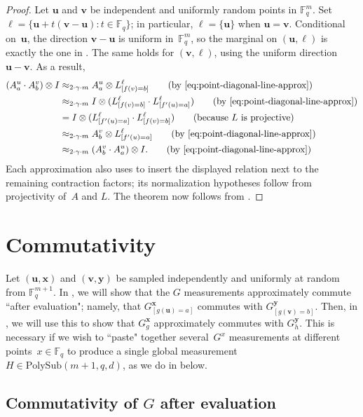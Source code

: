\documentclass[11pt]{article}
\theoremstyle{definition}
\newcommand{\F}{\mathbb F}
\newcommand{\bell}{\boldsymbol{\ell}}
\newcommand{\bu}{\boldsymbol{u}}
\newcommand{\bv}{\boldsymbol{v}}
\newcommand{\bx}{{\boldsymbol{x}}}
\newcommand{\by}{\boldsymbol{y}}
\newcommand{\polysub}[3]{\mathrm{PolySub}(#1, #2, #3)}
\begin{document}
\begin{proof}
Let $\bu$ and $\bv$ be independent and uniformly random points in $\F_q^m$.
Set $\bell=\{\bu+t(\bv-\bu):t\in\F_q\}$; in particular,
$\bell=\{\bu\}$ when $\bu=\bv$.  Conditional on~$\bu$, the
direction $\bv-\bu$ is uniform in~$\F_q^m$, so the marginal on
$(\bu,\bell)$ is exactly the one in
.  The same holds for
$(\bv,\bell)$, using the uniform direction $\bu-\bv$.
As a result,
\begin{align*}
(A^{u}_a \cdot A^{v}_b) \otimes I
&\approx_{2\cdot \gamma \cdot m} A^{u}_a \otimes L^{\ell}_{[f(v)=b]} \tag{by \Cref{eq:point-diagonal-line-approx}}\\
&\approx_{2\cdot \gamma \cdot m} I \otimes (L^{\ell}_{[f(v)=b]} \cdot L^{\ell}_{[f'(u)=a]}) \tag{by \Cref{eq:point-diagonal-line-approx}}\\
&= I \otimes (L^{\ell}_{[f'(u)=a]} \cdot L^{\ell}_{[f(v)=b]}) \tag{because~$L$ is projective}\\
&\approx_{2\cdot \gamma \cdot m} A^{v}_b \otimes L^{\ell}_{[f'(u)=a]} \tag{by \Cref{eq:point-diagonal-line-approx}}\\
&\approx_{2\cdot \gamma \cdot m} (A^{v}_b \cdot A^{u}_a) \otimes I. \tag{by \Cref{eq:point-diagonal-line-approx}}
\end{align*}
Each approximation also uses  to insert
the displayed relation next to the remaining contraction factors;
its normalization hypotheses follow from projectivity of~$A$ and
$L$.
The theorem now follows from
.
\end{proof}

\section{Commutativity}
\label{sec:g-comm}

Let $(\bu, \bx)$ and $(\bv, \by)$ be sampled independently and uniformly at random from $\F_q^{m+1}$.
In ,
we will show that the $G$ measurements approximately commute ``after evaluation";
namely, that $G^{\bx}_{[g(\bu)=a]}$ commutes with $G^{\by}_{[g(\bv)=b]}$.
Then, in ,
we will use this to show that $G^{\bx}_g$ approximately commutes with $G^{\by}_h$.
This is necessary if we wish to ``paste" together several~$G^x$ measurements at different points~$x \in \F_q$
to produce a single global measurement~$H \in \polysub{m+1}{q}{d}$, as we do in  below.

\subsection{\texorpdfstring{Commutativity of $G$ after evaluation}{Commutativity after evaluation}}\label{sec:G-commutes-after-evaluation}
\end{document}
